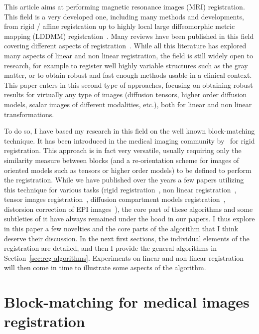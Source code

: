 \documentclass[a4paper]{article}
\begin{document}
This article aims at performing magnetic resonance images (MRI) registration. This field is a very developed one, including many methods and developments, from rigid / affine registration up to highly local large diffeomorphic metric mapping (LDDMM) registration~\cite{Beg_IJCV_2005,Avants_Media_2008}. Many reviews have been published in this field covering different aspects of registration~\cite{Pluim_2003,Oliveira_2014,Viergever_2016}. While all this literature has explored many aspects of linear and non linear registration, the field is still widely open to research, for example to register well highly variable structures such as the gray matter, or to obtain robust and fast enough methods usable in a clinical context. This paper enters in this second type of approaches, focusing on obtaining robust results for virtually any type of images (diffusion tensors, higher order diffusion models, scalar images of different modalities, etc.), both for linear and non linear transformations.

To do so, I have based my research in this field on the well known block-matching technique. It has been introduced in the medical imaging community by~\cite{Ourselin_Miccai_2000} for rigid registration. This approach is in fact very versatile, usually requiring only the similarity measure between blocks (and a re-orientation scheme for images of oriented models such as tensors or higher order models) to be defined to perform the registration. While we have published over the years a few papers utilizing this technique for various tasks (rigid registration~\cite{commowick:inserm-00681610}, non linear registration~\cite{Commowick_Miccai_2012}, tensor images registration~\cite{suarez:inserm-00657707}, diffusion compartment models registration~\cite{commowick:inserm-01556476}, distorsion correction of EPI images~\cite{Hedouin_TMI_2017}), the core part of these algorithms and some subtleties of it have always remained under the hood in our papers. I thus explore in this paper a few novelties and the core parts of the algorithm that I think deserve their discussion. In the next first sections, the individual elements of the registration  are detailed, and then I provide the general algorithms in Section~\ref{sec:reg-algorithms}. Experiments on linear and non linear registration will then come in time to illustrate some aspects of the algorithm.

\section{Block-matching for medical images registration}
\end{document}
